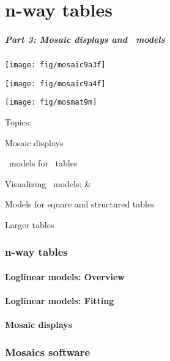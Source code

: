 \renewcommand{\FileName}{part3}

\part{n-way tables}
\begin{frame}
  \frametitle{Part 3: Mosaic displays and \loglin\ models}
 \begin{minipage}[c]{.33\textwidth}
  \texttt{[image: fig/mosaic9a3f]}
  \end{minipage}%
 \hfill
 \begin{minipage}[c]{.33\textwidth}
  \texttt{[image: fig/mosaic9a4f]}
 \end{minipage}
 \hfill
 \begin{minipage}[c]{.33\textwidth}
  \texttt{[image: fig/mosmat9m]}
 \end{minipage}

Topics:
  \begin{itemize*}
	\item Mosaic displays 
	\item \loglin\ models for \nway\ tables
    \item Visualizing \loglin\ models:  \& 
    \item Models for square and structured tables
	\item Larger tables
  \end{itemize*}
\end{frame}

\section{n-way tables}

\subsection{Loglinear models: Overview}

\subsection{Loglinear models: Fitting}

\subsection{Mosaic displays}


\section{Mosaics software}

